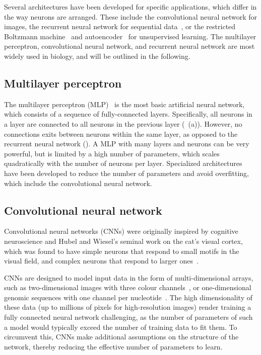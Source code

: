 Several architectures have been developed for specific applications, which differ in the way neurons are arranged. These include the convolutional neural network for images, the recurrent neural network for sequential data~\citep{lipton_critical_2015,sutskever_training_2013}, or the restricted Boltzmann machine~\citep{hinton_practical_2012,salakhutdinov_efficient_2010} and autoencoder~\citep{alain_regularized_2012,hinton_reducing_2006,kingma_auto-encoding_2013} for unsupervised learning. The multilayer perceptron, convolutional neural network, and recurrent neural network are most widely used in biology, and will be outlined in the following.


\subsection{Multilayer perceptron}

The multilayer perceptron (MLP)~\citep{rosenblatt_perceptron:_1958} is the most basic artificial neural network, which consists of a sequence of fully-connected layers. Specifically, all neurons in a layer are connected to all neurons in the previous layer (~(a)). However, no connections exits between neurons within the same layer, as opposed to the recurrent neural network (). A MLP with many layers and neurons can be very powerful, but is limited by a high number of parameters, which scales quadratically with the number of neurons per layer. Specialized architectures have been developed to reduce the number of parameters and avoid overfitting, which include the convolutional neural network.


\subsection{Convolutional neural network} \label{sec:dl_cnn}

Convolutional neural networks (CNNs) were originally inspired by cognitive neuroscience and Hubel and Wiesel's seminal work on the cat's visual cortex, which was found to have simple neurons that respond to small motifs in the visual field, and complex neurons that respond to larger ones~\citep{hubel_shape_1963,hubel_period_1970}.

CNNs are designed to model input data in the form of multi-dimensional arrays, such as two-dimensional images with three colour channels~\citep{he_deep_2015,jarrett_what_2009,krizhevsky_imagenet_2012,lecun_backpropagation_1989,szegedy_rethinking_2015,zeiler_visualizing_2014-1}, or one-dimensional genomic sequences with one channel per nucleotide~\citep{alipanahi_predicting_2015,angermueller_accurate_2017,kelley_basset:_2016,zhou_predicting_2015}. The high dimensionality of these data (up to millions of pixels for high-resolution images) render training a fully connected neural network challenging, as the number of parameters of such a model would typically exceed the number of training data to fit them. To circumvent this, CNNs make additional assumptions on the structure of the network, thereby reducing the effective number of parameters to learn.

